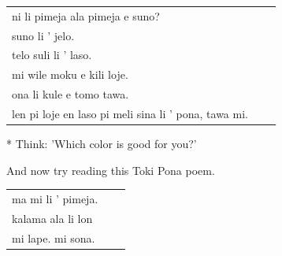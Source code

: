 \begin{supertabular}{p{5,5cm}|ll}
    ni li pimeja ala pimeja e suno?                      &  & \\ %
    suno li ' jelo.                                      &  & \\ %
    telo suli li ' laso.                                 &  & \\ %
    mi wile moku e kili loje.                            &  & \\ %
    ona li kule e tomo tawa.                             &  & \\ %
    len pi loje en laso pi meli sina li ' pona, tawa mi. &  & \\ %
\end{supertabular}

* Think: 'Which color is good for you?'

And now try reading this Toki Pona poem.

\begin{supertabular}{p{5,5cm}|ll}
    ma mi li ' pimeja. &  & \\ %
    kalama ala li lon  &  & \\ %
    mi lape. mi sona.  &  & \\ %
\end{supertabular}
